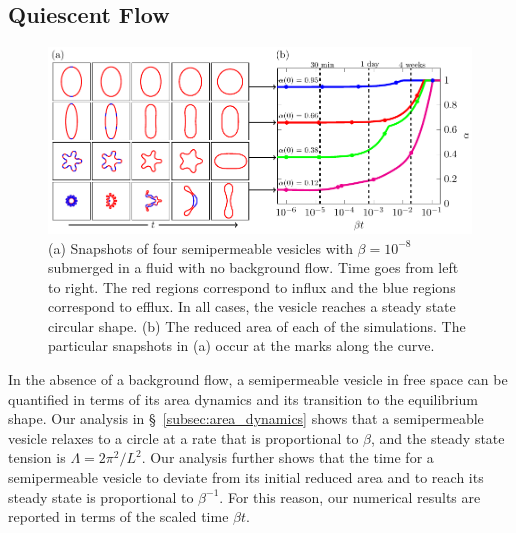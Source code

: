 \documentclass[prb,preprint,showpacs,preprintnumbers,amsmath,amssymb,longbibliography]{revtex4-1}
\newif\ifTikz
\begin{document}
\subsection{Quiescent Flow} 
\begin{figure}[htp]
  \centering
  \ifTikz
  
  \else
  \includegraphics{figures/relaxationComposite.pdf}
  \fi
  \caption{\label{fig:relaxationComposite} (a) Snapshots of four
  semipermeable vesicles with $\beta = 10^{-8}$ submerged in a fluid
  with no background flow. Time goes from left to right. The red regions
  correspond to influx and the blue regions correspond to efflux. In all
  cases, the vesicle reaches a steady state circular shape. (b) The
  reduced area of each of the simulations. The particular snapshots in
  (a) occur at the marks along the curve.}
\end{figure}
In the absence of a background flow, a semipermeable vesicle in free
space can be quantified in terms of its area dynamics and its transition
to the equilibrium shape. Our analysis in \S~\ref{subsec:area_dynamics} shows
that a semipermeable vesicle relaxes to a circle at a rate that is
proportional to $\beta$, and the steady state tension is $\Lambda =
2\pi^2/L^2$. Our analysis further shows that the time for a
semipermeable vesicle to deviate from its initial reduced area and to
reach its steady state is proportional to $\beta^{-1}$. For this reason,
our numerical results are reported in terms of the scaled time $\beta t$.
\end{document}
